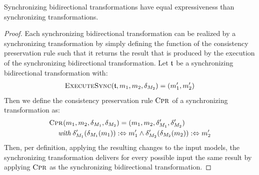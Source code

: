 \begin{theorem}
    Synchronizing bidirectional transformations have equal expressiveness than synchronizing transformations.
\end{theorem}
\begin{proof}
    Each synchronizing bidirectional transformation can be realized by a synchronizing transformation by simply defining the function of the consistency preservation rule such that it returns the result that is produced by the execution of the synchronizing bidirectional transformation.
    Let $\mathfrak{t}$ be a synchronizing bidirectional transformation with:
    \begin{align*}
        \textsc{ExecuteSync}(\mathfrak{t}, m_{1}, m_{2}, \delta_{M_{2}}) = (m_{1}', m_{2}')
    \end{align*}
    Then we define the consistency preservation rule $\textsc{Cpr}_{}$ of a synchronizing transformation as:
    \begin{align*}
        &
        \textsc{Cpr}_{}(m_{1}, m_{2}, \delta_{M_{1}}, \delta_{M_{2}}) = (m_{1}, m_{2}, \delta_{M_{1}}', \delta_{M_{2}}') \\
        & \hspace{1em}
        \; \textit{with} \; \delta_{M_{1}}'(\delta_{M_{1}}(m_{1})) :\Leftrightarrow m_{1}' 
        \land \delta_{M_{2}}'(\delta_{M_{2}}(m_{2})) :\Leftrightarrow m_{2}'
    \end{align*}
    Then, per definition, applying the resulting changes to the input models, the synchronizing transformation delivers for every possible input the same result by applying $\textsc{Cpr}_{}$ as the synchronizing bidirectional transformation.


\end{proof}
